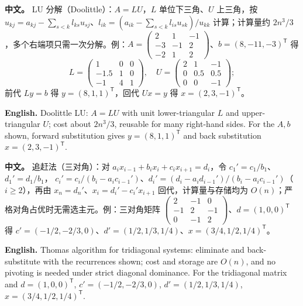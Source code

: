 \documentclass[UTF8,11pt,a4paper]{ctexart}
\newcommand{\APS}[2]{\par\noindent\textbf{中文。} #1\par\noindent\textbf{English.} #2\par\smallskip}
\begin{document}
\APS{LU 分解（Doolittle）：$A=LU$，$L$ 单位下三角、$U$ 上三角，按
$u_{kj}=a_{kj}-\sum_{s<k}l_{ks}u_{sj}$、$l_{ik}=(a_{ik}-\sum_{s<k}l_{is}u_{sk})/u_{kk}$ 计算；计算量约 $2n^3/3$，多个右端项只需一次分解。例：$A=\begin{pmatrix}2&1&-1\\-3&-1&2\\-2&1&2\end{pmatrix}$、$b=(8,-11,-3)^{\mathsf T}$ 得
\[
L=\begin{pmatrix}1&0&0\\-1.5&1&0\\-1&4&1\end{pmatrix},\quad
U=\begin{pmatrix}2&1&-1\\0&0.5&0.5\\0&0&-1\end{pmatrix};
\]
前代 $Ly=b$ 得 $y=(8,1,1)^{\mathsf T}$，回代 $Ux=y$ 得 $x=(2,3,-1)^{\mathsf T}$。}{Doolittle LU: $A=LU$ with unit lower-triangular $L$ and upper-triangular $U$; cost about $2n^3/3$, reusable for many right-hand sides. For the $A,b$ shown, forward substitution gives $y=(8,1,1)^{\mathsf T}$ and back substitution $x=(2,3,-1)^{\mathsf T}$.}
\APS{追赶法（三对角）：对 $a_ix_{i-1}+b_ix_i+c_ix_{i+1}=d_i$，令 $c_1'=c_1/b_1$、$d_1'=d_1/b_1$，
$c_i'=c_i/(b_i-a_ic_{i-1}')$、$d_i'=(d_i-a_id_{i-1}')/(b_i-a_ic_{i-1}')$（$i\ge2$），再由 $x_n=d_n'$、$x_i=d_i'-c_i'x_{i+1}$ 回代，计算量与存储均为 $O(n)$；严格对角占优时无需选主元。例：三对角矩阵 $\begin{pmatrix}2&-1&0\\-1&2&-1\\0&-1&2\end{pmatrix}$、$d=(1,0,0)^{\mathsf T}$ 得 $c'=(-1/2,-2/3,0)$、$d'=(1/2,1/3,1/4)$、$x=(3/4,1/2,1/4)^{\mathsf T}$。}{Thomas algorithm for tridiagonal systems: eliminate and back-substitute with the recurrences shown; cost and storage are $O(n)$, and no pivoting is needed under strict diagonal dominance. For the tridiagonal matrix and $d=(1,0,0)^{\mathsf T}$, $c'=(-1/2,-2/3,0)$, $d'=(1/2,1/3,1/4)$, $x=(3/4,1/2,1/4)^{\mathsf T}$.}
\end{document}
